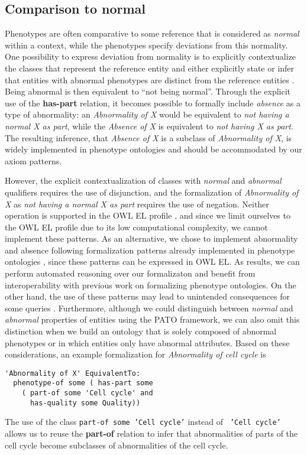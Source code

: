 \documentclass{article}
\begin{document}
\subsection{Comparison to normal}
Phenotypes are often comparative to some reference that is considered
as {\em normal} within a context, while the phenotypes specify
deviations from this normality. One possibility to express deviation
from normality is to explicitly contextualize the classes that
represent the reference entity and either explicitly state or infer
that entities with abnormal phenotypes are distinct from the reference
entities \cite{Hoehndorf2010phene}. Being abnormal is then equivalent
to ``not being normal''. Through the explicit use of the {\bf
  has-part} relation, it becomes possible to formally include {\em
  absence} as a type of abnormality: an {\em Abnormality of X} would
be equivalent to {\em not having a normal X as part}, while the {\em
  Absence of X} is equivalent to {\em not having X as part}. The
resulting inference, that {\em Absence of X} is a subclass of {\em
  Abnormality of X}, is widely implemented in phenotype ontologies
and should be accommodated by our axiom patterns. 

However, the explicit contextualization of classes with {\em normal}
and {\em abnormal} qualifiers requires the use of disjunction, and the
formalization of {\em Abnormality of X} as {\em not having a normal X
  as part} requires the use of negation. Neither operation is
supported in the OWL EL profile \cite{owlprofiles}, and since we limit
ourselves to the OWL EL profile due to its low computational
complexity, we cannot implement these patterns.  As an alternative, we
chose to implement abnormality and absence following formalization
patterns already implemented in phenotype ontologies
\cite{Mungall2010, Hoehndorf2011phenome}, since these patterns can be
expressed in OWL EL. As results, we can perform automated reasoning
over our formalizaton and benefit from interoperability with previous
work on formalizing phenotype ontologies. On the other hand, the use
of these patterns may lead to unintended consequences for some queries
\cite{Boeker2011}.  Furthermore, although we could distinguish between
{\em normal} and {\em abnormal} properties of entities using the PATO
framework, we can also omit this distinction when we build an ontology
that is solely composed of abnormal phenotypes or in which entities
only have abnormal attributes.  Based on these considerations, an
example formalization for {\em Abnormality of cell cycle} is
\begin{verbatim}
'Abnormality of X' EquivalentTo:
  phenotype-of some ( has-part some
    ( part-of some 'Cell cycle' and
      has-quality some Quality))
\end{verbatim}
The use of the class {\tt part-of some 'Cell cycle'} instead of {\tt
  'Cell cycle'} allows us to reuse the {\bf part-of} relation to infer
that abnormalities of parts of the cell cycle become subclasses of
abnormalities of the cell cycle.
\end{document}
